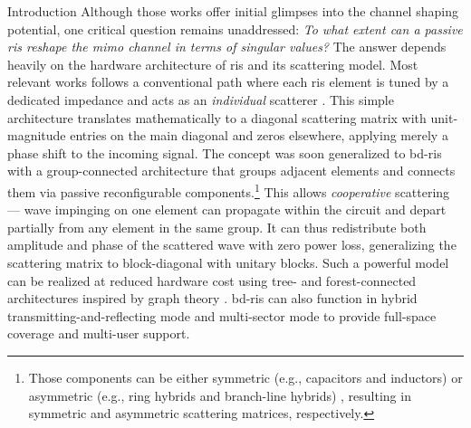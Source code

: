 \documentclass[journal]{IEEEtran}
\begin{document}
\begin{section}{Introduction}
	Although those works offer initial glimpses into the channel shaping potential, one critical question remains unaddressed: \emph{To what extent can a passive \gls{ris} reshape the \gls{mimo} channel in terms of singular values?}
	The answer depends heavily on the hardware architecture of \gls{ris} and its scattering model.
	Most relevant works \cite{ElMossallamy2021,Meng2023,Zheng2022,Huang2023,Bafghi2022,Zheng2023,Chae2023,Wu2019,Santamaria2023a} follows a conventional path where each \gls{ris} element is tuned by a dedicated impedance and acts as an \emph{individual} scatterer \cite{Wu2020}.
	This simple architecture translates mathematically to a diagonal scattering matrix with unit-magnitude entries on the main diagonal and zeros elsewhere, applying merely a phase shift to the incoming signal.
	The concept was soon generalized to \gls{bd}-\gls{ris} with a group-connected architecture \cite{Shen2020a} that groups adjacent elements and connects them via passive reconfigurable components.\footnote{Those components can be either symmetric (e.g., capacitors and inductors) or asymmetric (e.g., ring hybrids and branch-line hybrids) \cite{Ahn2006}, resulting in symmetric and asymmetric scattering matrices, respectively.}
	This allows \emph{cooperative} scattering --- wave impinging on one element can propagate within the circuit and depart partially from any element in the same group.
	It can thus redistribute both amplitude and phase of the scattered wave with zero power loss, generalizing the scattering matrix to block-diagonal with unitary blocks.
	Such a powerful model can be realized at reduced hardware cost using tree- and forest-connected architectures inspired by graph theory \cite{Nerini2024}.
	\gls{bd}-\gls{ris} can also function in hybrid transmitting-and-reflecting mode \cite{Li2023b} and multi-sector mode \cite{Li2023c} to provide full-space coverage and multi-user support.

\end{section}
\end{document}
